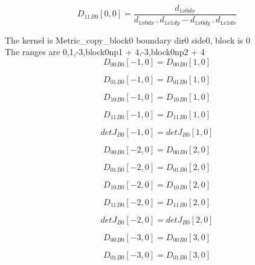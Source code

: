 \documentclass{article}
\begin{document}
\begin{dmath}{D_{11}{_{B0}}}[{0,0}] = \frac{d_{1 x0 dx}}{d_{1 x0 dx} \,.\, d_{1 x1 dy} - d_{1 x0 dy} \,.\, d_{1 x1 dx}}\end{dmath}

\noindent The kernel is Metric_copy_block0 boundary dir0 side0, block is 0\\\noindent The ranges are 0,1,-3,block0np1 + 4,-3,block0np2 + 4\\\begin{dmath}{D_{00}{_{B0}}}[{-1,0}] = {D_{00}{_{B0}}}[{1,0}]\end{dmath}

\begin{dmath}{D_{01}{_{B0}}}[{-1,0}] = {D_{01}{_{B0}}}[{1,0}]\end{dmath}

\begin{dmath}{D_{10}{_{B0}}}[{-1,0}] = {D_{10}{_{B0}}}[{1,0}]\end{dmath}

\begin{dmath}{D_{11}{_{B0}}}[{-1,0}] = {D_{11}{_{B0}}}[{1,0}]\end{dmath}

\begin{dmath}{detJ{_{B0}}}[{-1,0}] = {detJ{_{B0}}}[{1,0}]\end{dmath}

\begin{dmath}{D_{00}{_{B0}}}[{-2,0}] = {D_{00}{_{B0}}}[{2,0}]\end{dmath}

\begin{dmath}{D_{01}{_{B0}}}[{-2,0}] = {D_{01}{_{B0}}}[{2,0}]\end{dmath}

\begin{dmath}{D_{10}{_{B0}}}[{-2,0}] = {D_{10}{_{B0}}}[{2,0}]\end{dmath}

\begin{dmath}{D_{11}{_{B0}}}[{-2,0}] = {D_{11}{_{B0}}}[{2,0}]\end{dmath}

\begin{dmath}{detJ{_{B0}}}[{-2,0}] = {detJ{_{B0}}}[{2,0}]\end{dmath}

\begin{dmath}{D_{00}{_{B0}}}[{-3,0}] = {D_{00}{_{B0}}}[{3,0}]\end{dmath}

\begin{dmath}{D_{01}{_{B0}}}[{-3,0}] = {D_{01}{_{B0}}}[{3,0}]\end{dmath}
\end{document}
